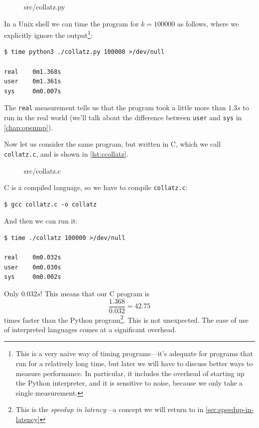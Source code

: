\begin{figure}

{src/collatz.py}
\end{figure}

In a Unix shell we can time the program for $k=100000$ as follows,
where we explicitly ignore the output\footnote{This is a very naive
  way of timing programs---it's adequate for programs that run for a
  relatively long time, but later we will have to discuss better ways
  to measure performance.  In particular, it includes the overhead of
  starting up the Python interpreter, and it is sensitive to noise,
  because we only take a single measurement.}:

\begin{lstlisting}
$ time python3 ./collatz.py 100000 >/dev/null

real    0m1.368s
user    0m1.361s
sys     0m0.007s
\end{lstlisting}

The \texttt{real} measurement tells us that the program took a little
more than $1.3s$ to run in the real world (we'll talk about the
difference between \texttt{user} and \texttt{sys} in
\cref{chap:openmp}).

Now let us consider the same program, but written in C, which we call
\texttt{collatz.c}, and is shown in \cref{lst:ccollatz}.

\begin{figure}

{src/collatz.c}
\end{figure}

C is a compiled language, so we have to compile \texttt{collatz.c}:

\begin{lstlisting}
$ gcc collatz.c -o collatz
\end{lstlisting}

And then we can run it:

\begin{lstlisting}
$ time ./collatz 100000 >/dev/null

real    0m0.032s
user    0m0.030s
sys     0m0.002s
\end{lstlisting}

Only $0.032s$!  This means that our C program is
\[
  \frac{1.368}{0.032} = 42.75
\]
times faster than the Python program\footnote{This is the
  \emph{speedup in latency}---a concept we will return to in
  \cref{sec:speedup-in-latency}}.  This is not unexpected.  The ease
of use of interpreted languages comes at a significant overhead.

